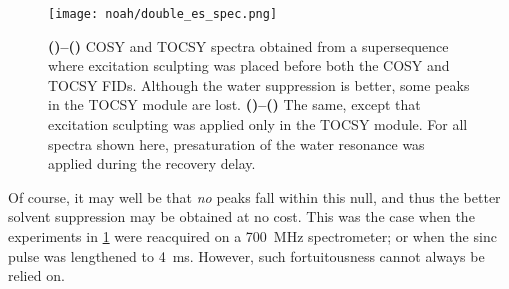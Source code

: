 \begin{figure}[htb]
    \centering
    \texttt{[image: noah/double\_es\_spec.png]}%
    {\label{fig:double_es_spec_2es_c}}%
    {\label{fig:double_es_spec_2es_t}}%
    {\label{fig:double_es_spec_1es_c}}%
    {\label{fig:double_es_spec_1es_t}}%
    \caption[Spectra of CT modules using single and double excitation sculpting]{
        \textbf{()--()} COSY and TOCSY spectra obtained from a  supersequence where excitation sculpting was placed before both the COSY and TOCSY FIDs.
        Although the water suppression is better, some peaks in the TOCSY module are lost.
        \textbf{()--()} The same, except that excitation sculpting was applied only in the TOCSY module.
        For all spectra shown here, presaturation of the water resonance was applied during the recovery delay.
    }
    \label{fig:double_es_spec}
\end{figure}

Of course, it may well be that \textit{no} peaks fall within this null, and thus the better solvent suppression may be obtained at no cost.
This was the case when the experiments in \cref{fig:double_es_spec} were reacquired on a \qty{700}{\MHz} spectrometer; or when the sinc pulse was lengthened to \qty{4}{\ms}.
However, such fortuitousness cannot always be relied on.
